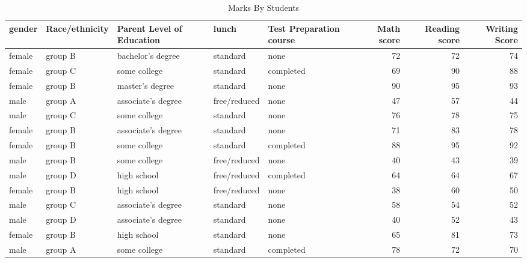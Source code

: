 \documentclass{article}
\begin{document}
	\begin{sidewaystable}[h!]
		\begin{center}
			\caption{Marks By Students}
			\label{tab:table1}
			\begin{tabular}{|l|l|l|l|l|r|r|r|}
				\textbf{gender} & \textbf{Race/ethnicity} & \textbf{Parent Level of Education} & \textbf{lunch} & \textbf{Test Preparation course} & \textbf{Math score} & \textbf{Reading score} & \textbf{Writing Score}\\
				\hline
				female & group B & bachelor's degree & standard & none & 72 & 72 & 74\\
				female & group C & some college & standard & completed & 69 & 90 & 88\\
				female & group B & master's degree & standard & none & 90 & 95 & 93\\
				male & group A & associate's degree & free/reduced & none & 47 & 57 & 44\\
				male & group C & some college & standard & none & 76 & 78 & 75\\
				female & group B & associate's degree & standard & none & 71 & 83 & 78\\
				female & group B & some college & standard & completed & 88 & 95 & 92\\
				male & group B & some college & free/reduced & none & 40 & 43 & 39\\
				male & group D & high school & free/reduced & completed & 64 & 64 & 67\\
				female & group B & high school & free/reduced & none & 38 & 60 & 50\\
				male & group C & associate's degree & standard & none & 58 & 54 & 52\\
				male & group D & associate's degree & standard & none & 40 & 52 & 43\\
				female & group B & high school & standard & none & 65 & 81 & 73\\
				male & group A & some college & standard & completed & 78 & 72 & 70\\
			\end{tabular}
		\end{center}
	\end{sidewaystable}
\end{document}
